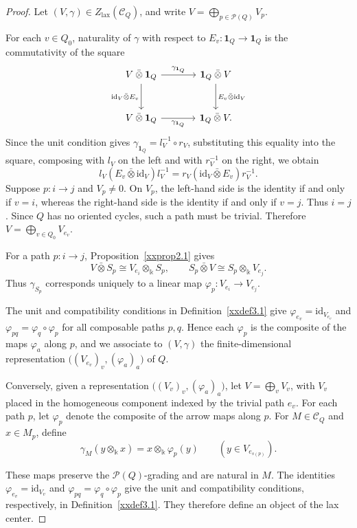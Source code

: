 \documentclass{amsart}
\newcommand{\id}{\mathrm{id}}
\newcommand{\btensor}{\mathbin{\bar{\otimes}}}
\theoremstyle{definition}
\theoremstyle{remark}
\numberwithin{equation}{section}
\begin{document}
\begin{proof}
Let
$(V,\gamma)\in Z_{\mathrm{lax}}(\mathcal C_Q)$,
and write
$V=\bigoplus_{p\in\mathcal P(Q)}V_p$.

For each $v\in Q_0$, naturality of $\gamma$ with respect to
$E_v\colon\mathbf1_Q\to\mathbf1_Q$ is the commutativity of the square
\[
\begin{tikzcd}[column sep=large,row sep=large]
V\btensor\mathbf1_Q
  \arrow[r,"\gamma_{\mathbf1_Q}"]
  \arrow[d,"\id_V\btensor E_v"']
&
\mathbf1_Q\btensor V
  \arrow[d,"E_v\btensor\id_V"]\\
V\btensor\mathbf1_Q
  \arrow[r,"\gamma_{\mathbf1_Q}"']
&
\mathbf1_Q\btensor V.
\end{tikzcd}
\]
Since the unit condition gives
$\gamma_{\mathbf1_Q}=l_V^{-1}\circ r_V$, substituting this equality into
the square, composing with $l_V$ on the left and with $r_V^{-1}$ on the
right, we obtain
\[
l_V(E_v\btensor\id_V)l_V^{-1}
=
r_V(\id_V\btensor E_v)r_V^{-1}.
\]
Suppose
$p\colon i\to j$
and
$V_p\neq0$.
On $V_p$, the left-hand side is the identity if and only if $v=i$, whereas the right-hand side is the identity if and only if $v=j$.
Thus $i=j$.
Since $Q$ has no oriented cycles, such a path must be trivial.
Therefore $V=\bigoplus_{v\in Q_0}V_{e_v}$.

For a path
$p\colon i\to j$,
Proposition~\ref{xxprop2.1} gives
\[
V\btensor S_p
\cong
V_{e_i}\otimes_{\Bbbk}S_p,
\qquad
S_p\btensor V
\cong
S_p\otimes_{\Bbbk}V_{e_j}.
\]
Thus $\gamma_{S_p}$ corresponds uniquely to a linear map
$\varphi_p\colon V_{e_i}\to V_{e_j}$.

The unit and compatibility conditions in
Definition~\ref{xxdef3.1} give
$\varphi_{e_v}=\id_{V_{e_v}}$ and
$\varphi_{pq}=\varphi_q\circ\varphi_p$ for all composable paths $p,q$.
Hence each $\varphi_p$ is the composite of the maps $\varphi_a$ along $p$,
and we associate to $(V,\gamma)$ the finite-dimensional representation
$\bigl((V_{e_v})_v,(\varphi_a)_a\bigr)$ of $Q$.

Conversely, given a representation
$\bigl((V_v)_v,(\varphi_a)_a\bigr)$, let
$V=\bigoplus_vV_v$,
with $V_v$ placed in the homogeneous component indexed by the trivial
path $e_v$.
For each path $p$, let $\varphi_p$ denote the composite of the arrow maps along
$p$.
For $M\in\mathcal C_Q$ and $x\in M_p$, define
\[
\gamma_M(y\otimes_{\Bbbk} x)
=
x\otimes_{\Bbbk}\varphi_p(y)
\qquad
(y\in V_{e_{s(p)}}).
\]

These maps preserve the $\mathcal P(Q)$-grading and are natural in $M$.
The identities $\varphi_{e_v}=\id_{V_v}$ and
$\varphi_{pq}=\varphi_q\circ\varphi_p$ give the unit and compatibility
conditions, respectively, in Definition~\ref{xxdef3.1}.
They therefore define an object of the lax center.


\end{proof}
\end{document}
